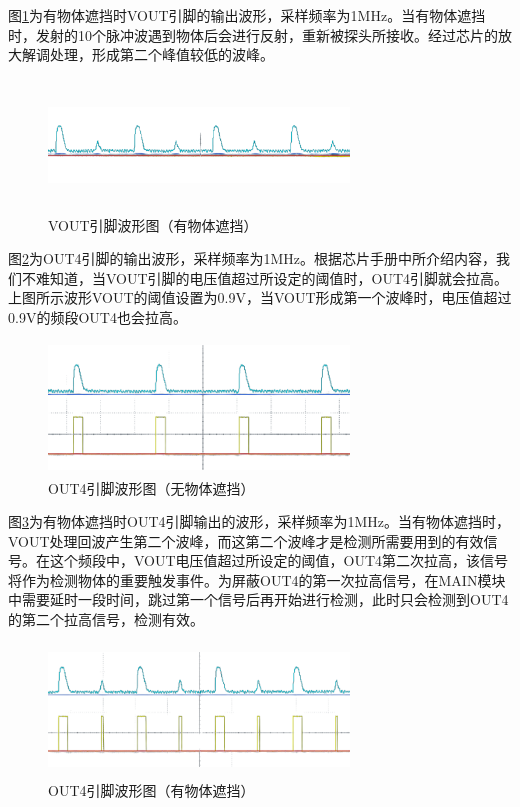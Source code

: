 图\ref{VOUT引脚波形图（有物体遮挡）}为有物体遮挡时VOUT引脚的输出波形，采样频率为1MHz。当有物体遮挡时，发射的10个脉冲波遇到物体后会进行反射，重新被探头所接收。经过芯片的放大解调处理，形成第二个峰值较低的波峰。
\begin{figure}[!h]
	\centering
	\includegraphics[width=8cm,height=3.5cm]{figure/debug waveform6.png}
	\caption{VOUT引脚波形图（有物体遮挡）}
	\label{VOUT引脚波形图（有物体遮挡）}
\end{figure}\par

图\ref{OUT4引脚波形图（无物体遮挡）}为OUT4引脚的输出波形，采样频率为1MHz。根据芯片手册中所介绍内容，我们不难知道，当VOUT引脚的电压值超过所设定的阈值时，OUT4引脚就会拉高。上图所示波形VOUT的阈值设置为0.9V，当VOUT形成第一个波峰时，电压值超过0.9V的频段OUT4也会拉高。
\begin{figure}[!h]
	\centering
	\includegraphics[width=8cm,height=3.5cm]{figure/debug waveform7.png}
	\caption{OUT4引脚波形图（无物体遮挡）}
	\label{OUT4引脚波形图（无物体遮挡）}
\end{figure}\par

\newpage
图\ref{OUT4引脚波形图（有物体遮挡）}为有物体遮挡时OUT4引脚输出的波形，采样频率为1MHz。当有物体遮挡时，VOUT处理回波产生第二个波峰，而这第二个波峰才是检测所需要用到的有效信号。在这个频段中，VOUT电压值超过所设定的阈值，OUT4第二次拉高，该信号将作为检测物体的重要触发事件。为屏蔽OUT4的第一次拉高信号，在MAIN模块中需要延时一段时间，跳过第一个信号后再开始进行检测，此时只会检测到OUT4的第二个拉高信号，检测有效。
\begin{figure}[!h]
	\centering
	\includegraphics[width=8cm,height=3.5cm]{figure/debug wave form8.png}
	\caption{OUT4引脚波形图（有物体遮挡）}
	\label{OUT4引脚波形图（有物体遮挡）}
\end{figure}\par




